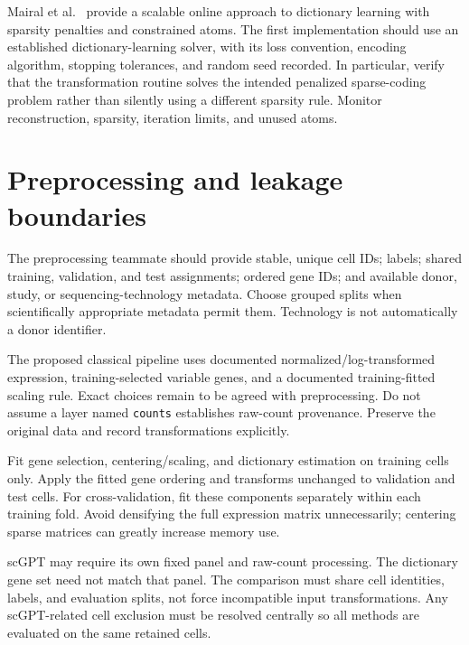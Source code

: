 \documentclass[11pt]{article}
\begin{document}
Mairal et al.~\cite{mairal2010} provide a scalable online approach to dictionary learning with sparsity penalties and constrained atoms. The first implementation should use an established dictionary-learning solver, with its loss convention, encoding algorithm, stopping tolerances, and random seed recorded. In particular, verify that the transformation routine solves the intended penalized sparse-coding problem rather than silently using a different sparsity rule. Monitor reconstruction, sparsity, iteration limits, and unused atoms.

\section{Preprocessing and leakage boundaries}
The preprocessing teammate should provide stable, unique cell IDs; labels; shared training, validation, and test assignments; ordered gene IDs; and available donor, study, or sequencing-technology metadata. Choose grouped splits when scientifically appropriate metadata permit them. Technology is not automatically a donor identifier.

The proposed classical pipeline uses documented normalized/log-transformed expression, training-selected variable genes, and a documented training-fitted scaling rule. Exact choices remain to be agreed with preprocessing. Do not assume a layer named \texttt{counts} establishes raw-count provenance. Preserve the original data and record transformations explicitly.

Fit gene selection, centering/scaling, and dictionary estimation on training cells only. Apply the fitted gene ordering and transforms unchanged to validation and test cells. For cross-validation, fit these components separately within each training fold. Avoid densifying the full expression matrix unnecessarily; centering sparse matrices can greatly increase memory use.

scGPT may require its own fixed panel and raw-count processing. The dictionary gene set need not match that panel. The comparison must share cell identities, labels, and evaluation splits, not force incompatible input transformations. Any scGPT-related cell exclusion must be resolved centrally so all methods are evaluated on the same retained cells.
\end{document}
